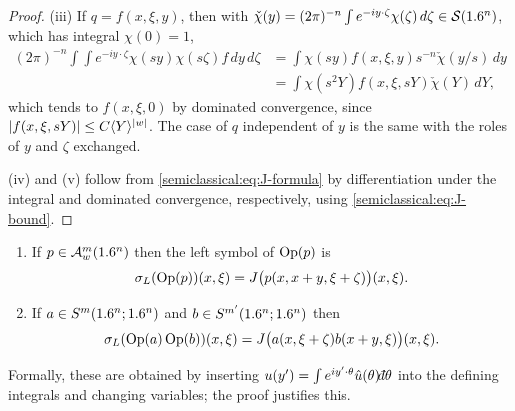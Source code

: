 \begin{proof}
  (iii) If $q=f(x,\xi,y)$, then with
  $\check\chi(y)=(2\pi)^{-n}\int e^{-iy\cdot\zeta}\chi(\zeta)\,d\zeta\in\mathcal{S}(1.6^n)$,
  which has integral $\chi(0)=1$,
  \begin{align*}
    (2\pi)^{-n}\int\!\!\int e^{-iy\cdot\zeta}\chi(sy)\chi(s\zeta)f\,dy\,d\zeta
    &=\int\chi(sy)f(x,\xi,y)s^{-n}\check\chi(y/s)\,dy\\
    &=\int\chi(s^2Y)f(x,\xi,sY)\check\chi(Y)\,dY,
  \end{align*}
  which tends to $f(x,\xi,0)$ by dominated convergence, since
  $\lvert f(x,\xi,sY)\rvert\le C\langle Y\rangle^{\lvert w\rvert}$. The case of $q$ independent of $y$ is
  the same with the roles of $y$ and $\zeta$ exchanged.

  (iv) and (v) follow from \eqref{semiclassical:eq:J-formula} by
  differentiation under the integral and dominated convergence, respectively,
  using \eqref{semiclassical:eq:J-bound}.
\end{proof}

\begin{proposition}\label{semiclassical:prop:exact}
  \begin{enumerate}[label=\textup{(\roman*)}]
  \item If $p\in\mathcal{A}^{m}_{w}(1.6^n)$ then the left symbol of $\operatorname{Op}(p)$ is
    \begin{equation*}
      \sigma_L(\operatorname{Op}(p))(x,\xi)=J\bigl(p(x,x+y,\xi+\zeta)\bigr)(x,\xi).
    \end{equation*}
  \item If $a\in S^m(1.6^n;1.6^n)$ and $b\in S^{m'}(1.6^n;1.6^n)$ then
    \begin{equation*}
      \sigma_L(\operatorname{Op}(a)\operatorname{Op}(b))(x,\xi)=J\bigl(a(x,\xi+\zeta)b(x+y,\xi)\bigr)(x,\xi).
    \end{equation*}
  \end{enumerate}
\end{proposition}

Formally, these are obtained by inserting $u(y')=\int e^{iy'\cdot\theta}\hat u(\theta)\dbar\theta$
into the defining integrals and changing variables; the proof justifies this.

